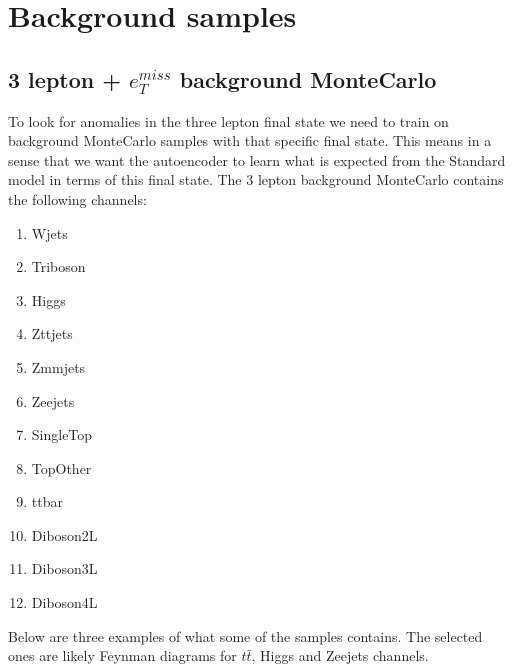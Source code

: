 \section{Background samples}

\subsection*{3 lepton + $e_T^{miss}$ background MonteCarlo}
To look for anomalies in the three lepton final state we need to train on background MonteCarlo samples with that specific final state. 
This means in a sense that we want the autoencoder to learn what is expected from the Standard model in terms of this final state. 
The 3 lepton background MonteCarlo contains the following channels:

\begin{enumerate}
    \item Wjets
    \item Triboson
    \item Higgs
    \item Zttjets
    \item Zmmjets
    \item Zeejets
    \item SingleTop
    \item TopOther
    \item ttbar
    \item Diboson2L
    \item Diboson3L
    \item Diboson4L
\end{enumerate}

Below are three examples of what some of the samples contains. The selected ones are likely Feynman diagrams for $t\bar{t}$, Higgs and Zeejets channels. 

